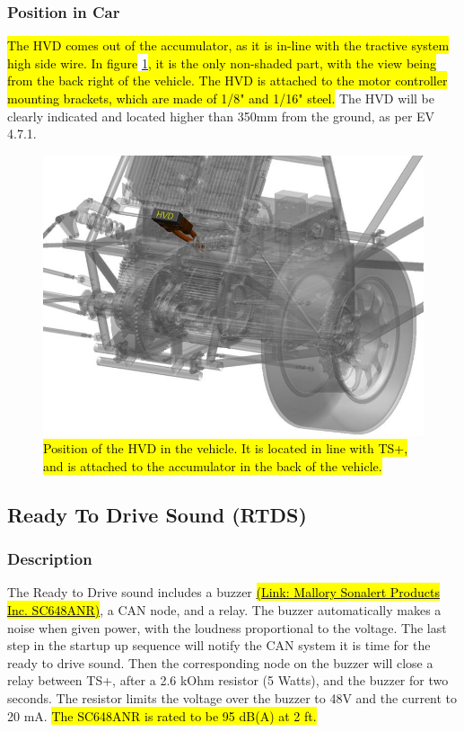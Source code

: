 \documentclass{article}
\DeclareRobustCommand{\hlr}[1]{{\sethlcolor{red}\hl{#1}}}
\begin{document}
        \subsubsection{Position in Car}

            \hlr{The HVD comes out of the accumulator, as it is in-line with the tractive system high side wire. In figure} \ref{hvdlocation}\hlr{, it is the only non-shaded part, with the view being from the back right of the vehicle. The HVD is attached to the motor controller mounting brackets, which are made of 1/8" and 1/16" steel.} The HVD will be clearly indicated and located higher than 350mm from the ground, as per EV 4.7.1.


        \begin{figure}[H]
            \centering
            \includegraphics[width = 0.6 \textwidth]{hvd_position}
            \caption{\hlr{Position of the HVD in the vehicle. It is located in line with TS+, and is attached to the accumulator in the back of the vehicle. }}
            \label{hvdlocation}
        \end{figure}

    \subsection{Ready To Drive Sound (RTDS)} \label{R2Dsection}

        \subsubsection{Description}

            The Ready to Drive sound includes a buzzer \href{http://www.mallory-sonalert.com/Specifications/SC648ANR.pdf}{\hlr{(Link: Mallory Sonalert Products Inc. SC648ANR)}}, a CAN node, and a relay. The buzzer automatically makes a noise when given power, with the loudness proportional to the voltage. The last step in the startup up sequence will notify the CAN system it is time for the ready to drive sound. Then the corresponding node on the buzzer will close a relay between TS+, after a 2.6 kOhm resistor (5 Watts), and the buzzer for two seconds. The resistor limits the voltage over the buzzer to 48V and the current to 20 mA. \hlr{The SC648ANR is rated to be 95 dB(A) at 2 ft.}
\end{document}
